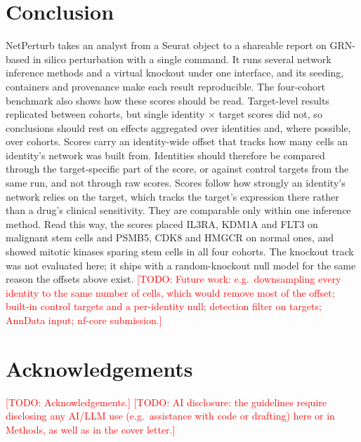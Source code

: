 \documentclass[unnumsec,webpdf,contemporary,large]{oup-authoring-template}
\newcommand{\todo}[1]{\textcolor{red}{[TODO: #1]}}
\begin{document}
\section{Conclusion}

NetPerturb takes an analyst from a Seurat object to a shareable report on GRN-based in silico perturbation with a single command. It runs several network inference methods and a virtual knockout under one interface, and its seeding, containers and provenance make each result reproducible. The four-cohort benchmark also shows how these scores should be read. Target-level results replicated between cohorts, but single identity $\times$ target scores did not, so conclusions should rest on effects aggregated over identities and, where possible, over cohorts. Scores carry an identity-wide offset that tracks how many cells an identity's network was built from. Identities should therefore be compared through the target-specific part of the score, or against control targets from the same run, and not through raw scores. Scores follow how strongly an identity's network relies on the target, which tracks the target's expression there rather than a drug's clinical sensitivity. They are comparable only within one inference method. Read this way, the scores placed IL3RA, KDM1A and FLT3 on malignant stem cells and PSMB5, CDK8 and HMGCR on normal ones, and showed mitotic kinases sparing stem cells in all four cohorts. The knockout track was not evaluated here; it ships with a random-knockout null model for the same reason the offsets above exist. \todo{Future work: e.g.\ downsampling every identity to the same number of cells, which would remove most of the offset; built-in control targets and a per-identity null; detection filter on targets; AnnData input; nf-core submission.}


\section{Acknowledgements}
\todo{Acknowledgements.} \todo{AI disclosure: the guidelines require disclosing any AI/LLM use (e.g.\ assistance with code or drafting) here or in Methods, as well as in the cover letter.}
\end{document}
